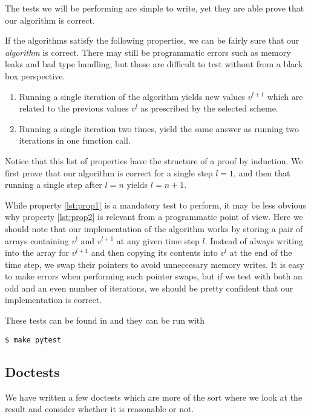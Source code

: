 The tests we will be performing are simple to write, yet they are able prove that our algorithm is correct.

If the algorithms satisfy the following properties, we can be fairly sure that our \emph{algorithm} is correct. There may still be programmatic errors such as memory leaks and bad type handling, but those are difficult to test without from a black box perspective.
\begin{enumerate}[label=(\roman*)]
    \item Running a single iteration of the algorithm yields new values $v^{l+1}$ which are related to the previous values $v^l$ as prescribed by the selected scheme. \label{lst:prop1}
    \item Running a single iteration two times, yield the same answer as running two iterations in one function call.\label{lst:prop2}
\end{enumerate}

Notice that this list of properties have the structure of a proof by induction. We first prove that our algorithm is correct for a single step $l = 1$, and then that running a single step after $l = n$ yields $l = n+1$.

While property \ref{lst:prop1} is a mandatory test to perform, it may be less obvious why property \ref{lst:prop2} is relevant from a programmatic point of view. Here we should note that our implementation of the algorithm works by storing a pair of arrays containing $v^l$ and $v^{l+1}$ at any given time step $l$. Instead of always writing into the array for $v^{l+1}$ and then copying its contents into $v^l$ at the end of the time step, we swap their pointers to avoid unneccesary memory writes. It is easy to make errors when performing such pointer swaps, but if we test with both an odd and an even number of iterations, we should be pretty confident that our implementation is correct.

These tests can be found in  and they can be run with

\begin{verbatim}
$ make pytest
\end{verbatim}

\subsection{Doctests}
\label{appx:testing:doctests}
We have written a few doctests which are more of the sort where we look at the result and consider whether it is reasonable or not.


